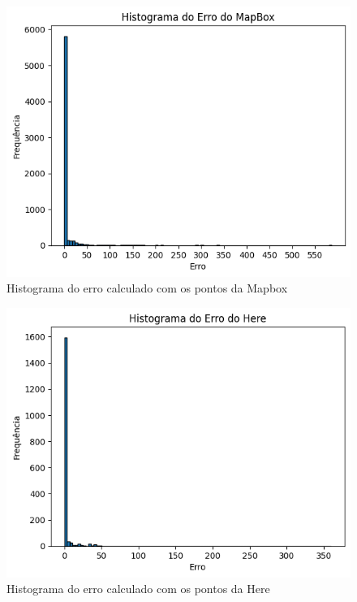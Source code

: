 \begin{figure}[h]
  \centering
  \includegraphics[width=\textwidth]{Figuras/hist1.png}
  \caption{Histograma do erro calculado com os pontos da Mapbox}
  \label{fig:hist1}
\end{figure}

\begin{figure}[h]
  \centering
  \includegraphics[width=\textwidth]{Figuras/hist2.png}
  \caption{Histograma do erro calculado com os pontos da Here}
  \label{fig:hist2}
\end{figure}

